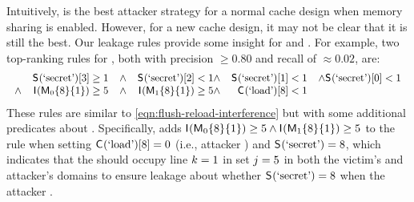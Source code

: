 Intuitively, \flushreload is the best attacker strategy for a normal
cache design when memory sharing is enabled.  However, for a new cache
design, it may not be clear that it is still the best.  Our leakage
rules provide some insight for \scatterCache and .  For
example, two top-ranking rules for \scatterCache, both with precision
$\ge 0.80$ and recall of $\approx 0.02$, are:
\begin{align}
  {\small\begin{array}{rrrrrrrr}
    & \SecFn{}(\secretVar)[3]\ge 1 & \wedge
    & \SecFn{}(\secretVar)[2]<1 
    \wedge
    & \SecFn{}(\secretVar)[1]<1 & \wedge
     \SecFn{}(\secretVar)[0]<1 \\
    \wedge
    & \AIIFn{}(\cacheMapEntry{\victimDomainId}{8}{1}) \ge 5 & \wedge
    & \AIIFn{}(\cacheMapEntry{\attackerDomainId}{8}{1}) \ge 5 
    \wedge
    & \ACIFn{}(\loadVar)[8]<1
  \end{array}} \label{eqn:scatter-interference-ruleOne}
\if 0
\\
  {\small\begin{array}{rrrrrrrr}
    & \SecFn{}(\secretVar)[0]<1 & \wedge
    & \SecFn{}(\secretVar)\ge 10 \\
    \wedge
    & \SecFn{}(\secretVar)<12 & \wedge
    & \AIIFn{}(\cacheMapEntry{\victimDomainId}{10}{0}) \ge 5 \\
    \wedge
    & \AIIFn{}(\cacheMapEntry{\attackerDomainId}{10}{0}) \ge 5 & \wedge
    & \ACIFn{}(\loadVar)[10]<1
  \end{array}} \label{eqn:scatter-interference-ruleTwo}
\fi
\end{align}
These rules are similar to \eqref{eqn:flush-reload-interference} but
with some additional predicates about
\cacheMap{\victimDomainId}. Specifically,
 adds
$\mathsf{I}_{}(\textsf{M}_{0}\{8\}\{1\})\ge 5 \wedge
\mathsf{I}_{}(\textsf{M}_{1}\{8\}\{1\})\ge 5$ to the rule
when setting $\mathsf{C}_{}(\textrm{`load'})[8]=0$ (i.e., attacker 
) and $\mathsf{S}_{}(\textrm{`secret'}) = 8$, which indicates that the
 should occupy line $k=1$ in set $j=5$ in
both the victim's and attacker's domains to ensure leakage about
whether $\mathsf{S}_{}(\textrm{`secret'}) = 8$ when the attacker 
. 

